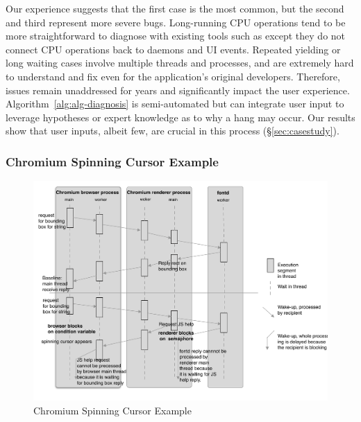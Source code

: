 \noindent
Our experience suggests that the first case is the most common, but the
second and third represent more severe bugs. Long-running CPU operations tend to
be more straightforward to diagnose with existing tools such as \spindump except
they do not connect CPU operations back to daemons and UI events. Repeated yielding or
long waiting cases involve multiple threads and processes, and are extremely
hard to understand and fix even for the application's original developers.
Therefore, issues remain unaddressed for years and significantly impact the
user experience. Algorithm~\ref{alg:alg-diagnosis} is semi-automated but can
integrate user input to leverage hypotheses or expert knowledge
as to why a hang may occur. Our results show that user inputs, albeit few, are
crucial in this process (\S\ref{sec:casestudy}).

\subsubsection{Chromium Spinning Cursor Example}

\begin{figure}[tb]
	\footnotesize
    \centering
	\includegraphics[width=\columnwidth]{./figures/chromium_case_study_2.pdf}
    \caption{Chromium Spinning Cursor Example}
    \label{fig:chromium-case-study}
\end{figure}

